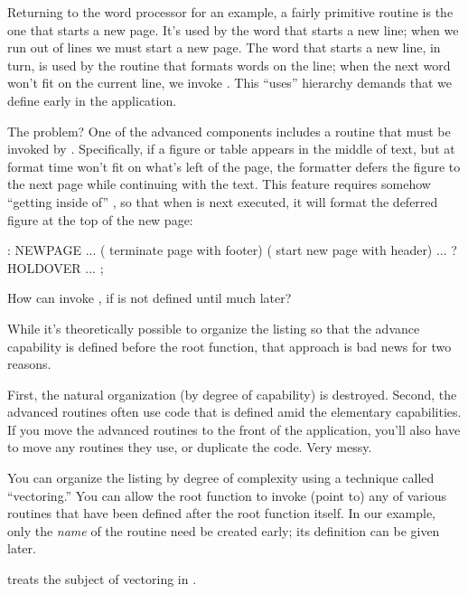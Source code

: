 Returning to the word processor for an example, a fairly primitive
routine is the one that starts a new page. It's used by the word that
starts a new line; when we run out of lines we must start a new
page. The word that starts a new line, in turn, is used by the routine
that formats words on the line; when the next word won't fit on the
current line, we invoke . This ``uses'' hierarchy demands that
we define  early in the application.

The problem? One of the advanced components includes a routine that
must be invoked by . Specifically, if a figure or table
appears in the middle of text, but at format time won't fit on what's
left of the page, the formatter defers the figure to the next page
while continuing with the text. This feature requires somehow
``getting inside of'' , so that when  is
next executed, it will format the deferred figure at the top of the
new page:

\begin{Code}
: NEWPAGE  ... ( terminate page with footer)
   ( start new page with header)  ...  ?HOLDOVER ... ;
\end{Code}
How can  invoke , if  is
not defined until much later?

While it's theoretically possible to organize the listing so that the
advance capability is defined before the root function, that approach is
bad news for two reasons.

First, the natural organization (by degree of capability) is
destroyed. Second, the advanced routines often use code that is defined
amid the elementary capabilities. If you move the advanced routines to
the front of the application, you'll also have to move any routines they
use, or duplicate the code. Very messy.

You can organize the listing by degree of complexity using a technique
called ``vectoring.'' You can allow the root function to invoke (point
to) any of various routines that have been defined after the root
function itself. In our example, only the \emph{name} of the routine
 need be created early; its definition can be given later.%

 treats the subject of vectoring in \Forth{}.%
%
%

